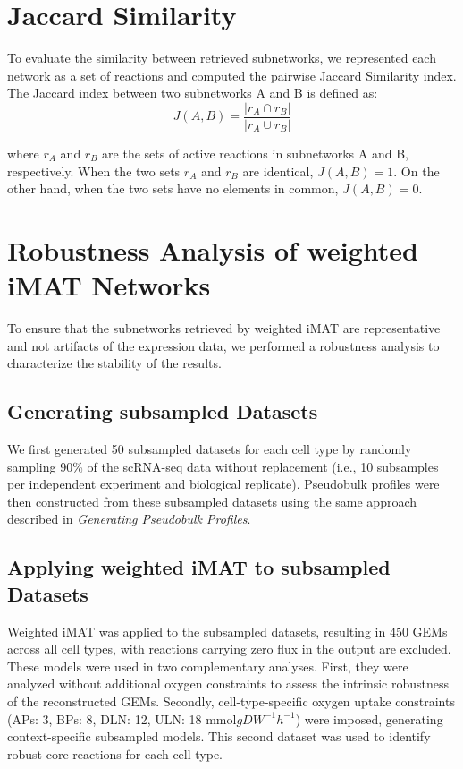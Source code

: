 \section{Jaccard Similarity}
To evaluate the similarity between retrieved subnetworks, we represented each network as a set of reactions and computed the pairwise Jaccard Similarity index. The Jaccard index between two subnetworks A and B is defined as: 
\begin{equation}
    J(A,B) = \frac{\left|r_A \cap r_B\right|}{\left|r_A \cup r_B\right|}
\end{equation}

where $r_A$ and $r_B$ are the sets of active reactions in subnetworks A and B, respectively. When the two sets $r_A$ and $r_B$ are identical, $J(A,B)=1$. On the other hand,
when the two sets have no elements in common, $J(A,B)=0$.


\section{Robustness Analysis of weighted iMAT Networks}
To ensure that the subnetworks retrieved by weighted iMAT are representative and not artifacts of the expression data, we performed a robustness analysis to characterize the stability of the results. 

\subsection{Generating subsampled Datasets}
We first generated 50 subsampled datasets for each cell type by randomly sampling 90\% of the scRNA-seq data without replacement (i.e., 10 subsamples per independent experiment and biological replicate). Pseudobulk profiles were then constructed from these subsampled datasets using the same approach described in
\textit{Generating Pseudobulk Profiles}.

\subsection{Applying weighted iMAT to subsampled Datasets}
Weighted iMAT was applied to the subsampled datasets, resulting in 450 GEMs across all cell types, with reactions carrying zero flux in the output are excluded. These models were used in two complementary analyses. First, they were analyzed without additional oxygen constraints to assess the intrinsic robustness of the reconstructed GEMs. Secondly, cell-type-specific oxygen uptake constraints (APs: 3, BPs: 8, DLN: 12, ULN: 18 $\text{mmol} gDW^{-1} h^{-1}$)
were imposed, generating context-specific subsampled models. This second dataset was used to identify robust core reactions for each cell type.


